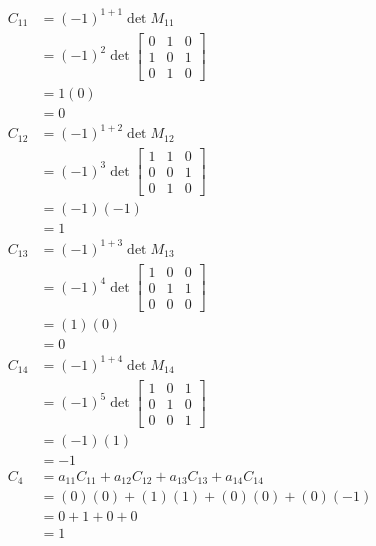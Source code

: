 \documentclass[main.tex]{subfiles}
\begin{document}
\begin{enumerate}
\begin{enumerate}
        $$
        \begin{aligned}
        C_{11} &= (-1)^{1+1} \operatorname{det} M_{11}\\
        &=(-1)^{2} \operatorname{det}\left[\begin{array}{lll}
        0 & 1 & 0 \\
        1 & 0 & 1 \\
        0 & 1 & 0
        \end{array}\right]\\
        &=1(0)\\
        &=0\\
        C_{12} &= (-1)^{1+2} \operatorname{det} M_{12}\\
        &=(-1)^{3} \operatorname{det}\left[\begin{array}{lll}
        1 & 1 & 0 \\
        0 & 0 & 1 \\
        0 & 1 & 0
        \end{array}\right]\\
        &=(-1)(-1)\\
        &=1\\
        C_{13}&=(-1)^{1+3} \operatorname{det} M_{13}\\
        &=(-1)^{4} \operatorname{det}\left[\begin{array}{lll}
        1 & 0 & 0 \\
        0 & 1 & 1 \\
        0 & 0 & 0
        \end{array}\right]\\
        &=(1)(0)\\
        &=0\\
        C_{14}&=(-1)^{1+4} \operatorname{det} M_{14}\\
        &=(-1)^{5} \operatorname{det}\left[\begin{array}{lll}
        1 & 0 & 1 \\
        0 & 1 & 0 \\
        0 & 0 & 1
        \end{array}\right]\\
        &=(-1)(1)\\
        &=-1\\
        C_{4}&=a_{11} C_{11}+a_{12} C_{12}+a_{13} C_{13}+a_{14} C_{14}\\
        &=(0)(0)+(1)(1)+(0)(0)+(0)(-1)\\
        &=0+1+0+0\\
        &=1
        \end{aligned}
        $$
        

\end{enumerate}
\end{enumerate}
\end{document}
